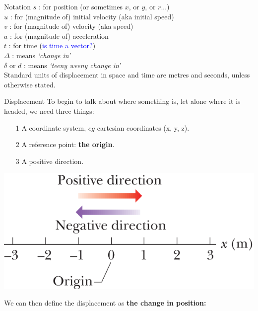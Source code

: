 %  
\begin{frame}{Notation}
$s$ : for position (or sometimes $x$, or $y$, or $r$...)\\
$u$ : for (magnitude of) initial velocity (aka initial speed)\\
$v$ : for (magnitude of) velocity (aka speed)\\
$a$ : for (magnitude of) acceleration\\
$t$ : for time (\textcolor{blue}{is time a vector?})\\[1ex]
$\Delta$ : means \textit{`change in'} \\[1ex]
$\delta$ or $d$ : means \textit{`teeny weeny change in'} \\[1ex]

Standard units of displacement in space and time are metres and seconds, unless otherwise stated.\\

\end{frame}
 
% 
\begin{frame}{Displacement}
\small
To begin to talk about where something is, let alone where it is headed, we need three things:
\begin{itemize}
\item[1]  A coordinate system, $eg$ cartesian coordinates (x, y, z).
\item[2]  A reference point: \textbf{the origin}.\\[1ex]
\item[3]  A positive direction.\\[1ex]
\end{itemize}

\begin{center}
\includegraphics[scale=0.8]{1.png}
\end{center}

We can then define the displacement as \textbf{ the change in position:} \\[1ex]


\end{frame}
 
